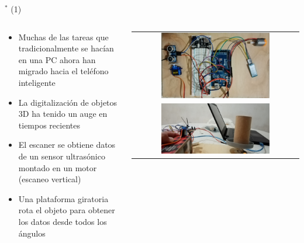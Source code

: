 
\begin{frame}{$^*$  (1)}
\begin{columns}
\begin{column}{0.6\textwidth}
	\begin{itemize}
		\item Muchas de las tareas que tradicionalmente se hacían en una PC ahora han migrado hacia el teléfono inteligente
        \item La digitalización de objetos 3D ha tenido un auge en tiempos recientes
		\item El escaner se obtiene datos de un sensor ultrasónico montado en un motor (escaneo vertical)
		\item Una plataforma giratoria rota el objeto para obtener los datos desde todos los ángulos
	\end{itemize}
\end{column}
\begin{column}{0.4\textwidth}  
\begin{center}
     \begin{tabular}{c}
\includegraphics[width=0.68\textwidth]{2022_Scanner3D/figs/Esc1}\\
\includegraphics[width=0.68\textwidth]{2022_Scanner3D/figs/Esc2}\\         
      \end{tabular}
\end{center}
\end{column} 
\end{columns} 
\end{frame}


